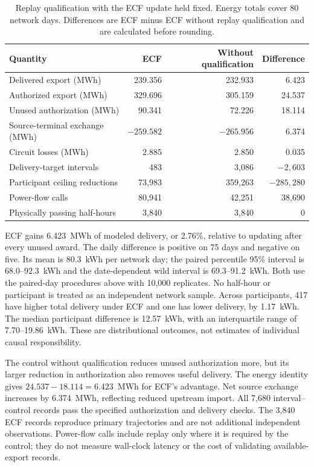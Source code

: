 \documentclass[11pt]{article}
\begin{document}
\begin{table}[!ht]
\centering
\caption{Replay qualification with the ECF update held fixed. Energy totals
cover 80 network days. Differences are ECF minus ECF without replay
qualification and are calculated before rounding.}
\label{tab:supp_same_update_qualification}
\small
\begin{tabular}{@{}lrrr@{}}
\toprule
Quantity & ECF & Without qualification & Difference \\
\midrule
Delivered export (MWh) & 239.356 & 232.933 & 6.423 \\
Authorized export (MWh) & 329.696 & 305.159 & 24.537 \\
Unused authorization (MWh) & 90.341 & 72.226 & 18.114 \\
Source-terminal exchange (MWh) & $-259.582$ & $-265.956$ & 6.374 \\
Circuit losses (MWh) & 2.885 & 2.850 & 0.035 \\
Delivery-target intervals & 483 & 3,086 & $-2,603$ \\
Participant ceiling reductions & 73,983 & 359,263 & $-285,280$ \\
Power-flow calls & 80,941 & 42,251 & 38,690 \\
Physically passing half-hours & 3,840 & 3,840 & 0 \\
\bottomrule
\end{tabular}
\end{table}

ECF gains 6.423~MWh of modeled delivery, or 2.76\%, relative to updating
after every unused award. The daily difference is positive on 75 days and
negative on five. Its mean is 80.3~kWh per network day; the paired percentile
95\% interval is 68.0--92.3~kWh and the date-dependent wild interval is
69.3--91.2~kWh. Both use the paired-day procedures above with 10,000
replicates. No half-hour or participant is treated as an independent network
sample. Across participants, 417 have higher total delivery under ECF and
one has lower delivery, by 1.17~kWh. The median participant difference is
12.57~kWh, with an interquartile range of 7.70--19.86~kWh. These are
distributional outcomes, not estimates of individual causal responsibility.

The control without qualification reduces unused authorization more, but its
larger reduction in authorization also removes useful delivery. The energy
identity gives $24.537-18.114=6.423$~MWh for ECF's advantage.
Net source exchange increases by 6.374~MWh, reflecting reduced upstream
import. All 7,680 interval--control records pass the specified authorization
and delivery checks. The 3,840 ECF records reproduce primary trajectories
and are not additional independent observations. Power-flow calls include
replay only where it is required by the control; they do not measure wall-clock
latency or the cost of validating available-export records.
\end{document}
